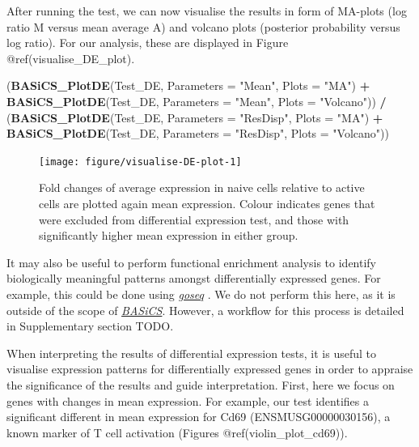 \documentclass[9pt,a4paper,]{extarticle}
\newenvironment{Shaded}{\begin{snugshade}}{\end{snugshade}}
\newcommand{\DataTypeTok}[1]{\textcolor[rgb]{0.13,0.29,0.53}{#1}}
\newcommand{\KeywordTok}[1]{\textcolor[rgb]{0.13,0.29,0.53}{\textbf{#1}}}
\newcommand{\NormalTok}[1]{#1}
\newcommand{\OperatorTok}[1]{\textcolor[rgb]{0.81,0.36,0.00}{\textbf{#1}}}
\newcommand{\StringTok}[1]{\textcolor[rgb]{0.31,0.60,0.02}{#1}}
\begin{document}
After running the test, we can now visualise the results in form of MA-plots
(log ratio M versus mean average A) and volcano plots (posterior probability
versus log ratio). For our analysis, these are displayed in
Figure @ref(visualise\_DE\_plot).

\begin{Shaded}
\begin{Highlighting}[]
\NormalTok{(}\KeywordTok{BASiCS_PlotDE}\NormalTok{(Test_DE, }\DataTypeTok{Parameters =} \StringTok{"Mean"}\NormalTok{, }\DataTypeTok{Plots =} \StringTok{"MA"}\NormalTok{) }\OperatorTok{+}
\StringTok{    }\KeywordTok{BASiCS_PlotDE}\NormalTok{(Test_DE, }\DataTypeTok{Parameters =} \StringTok{"Mean"}\NormalTok{, }\DataTypeTok{Plots =} \StringTok{"Volcano"}\NormalTok{)) }\OperatorTok{/}\StringTok{ }
\StringTok{  }\NormalTok{(}\KeywordTok{BASiCS_PlotDE}\NormalTok{(Test_DE, }\DataTypeTok{Parameters =} \StringTok{"ResDisp"}\NormalTok{, }\DataTypeTok{Plots =} \StringTok{"MA"}\NormalTok{) }\OperatorTok{+}
\StringTok{     }\KeywordTok{BASiCS_PlotDE}\NormalTok{(Test_DE, }\DataTypeTok{Parameters =} \StringTok{"ResDisp"}\NormalTok{, }\DataTypeTok{Plots =} \StringTok{"Volcano"}\NormalTok{))}
\end{Highlighting}
\end{Shaded}

\begin{figure}

{\centering \texttt{[image: figure/visualise-DE-plot-1]} 

}

\caption{Fold changes of average expression in naive cells relative to active cells are plotted again mean expression. Colour indicates genes that were excluded from differential expression test, and those with significantly higher mean expression in either group.}\label{fig:visualise-DE-plot}
\end{figure}

It may also be useful to perform functional enrichment analysis to identify
biologically meaningful patterns amongst differentially expressed genes.
For example, this could be done using \emph{\href{https://bioconductor.org/packages/3.11/goseq}{goseq}} \citep{Young2010}.
We do not perform this here, as it is outside of the scope of
\emph{\href{https://bioconductor.org/packages/3.11/BASiCS}{BASiCS}}.
However, a workflow for this process is detailed in Supplementary section TODO.

When interpreting the results of differential expression tests, it is useful
to visualise expression patterns for differentially expressed genes in order to
appraise the significance of the results and guide interpretation.
First, here we focus on genes with changes in mean expression.
For example, our test identifies a significant different in mean expression for
Cd69 (ENSMUSG00000030156), a known marker of T cell activation \citep{Ziegler1994}
(Figures @ref(violin\_plot\_cd69)).
\end{document}
